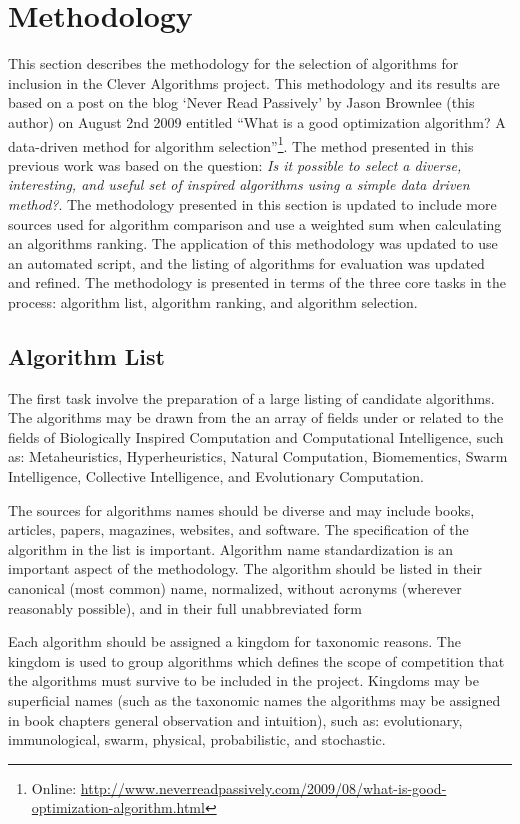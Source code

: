 \documentclass[a4paper, 11pt]{article}
\begin{document}
\section{Methodology}
\label{sec:methodology}
This section describes the methodology for the selection of algorithms for inclusion in the Clever Algorithms project. This methodology and its results are based on a post on the blog `Never Read Passively' by Jason Brownlee (this author) on August 2nd 2009 entitled ``What is a good optimization algorithm? A data-driven method for algorithm selection''\footnote{Online: \url{http://www.neverreadpassively.com/2009/08/what-is-good-optimization-algorithm.html}}. The method presented in this previous work was based on the question: \emph{Is it possible to select a diverse, interesting, and useful set of inspired algorithms using a simple data driven method?}. The methodology presented in this section is updated to include more sources used for algorithm comparison and use a weighted sum when calculating an algorithms ranking. The application of this methodology was updated to use an automated script, and the listing of algorithms for evaluation was updated and refined. The methodology is presented in terms of the three core tasks in the process: algorithm list, algorithm ranking, and algorithm selection.

% 
% 
\subsection{Algorithm List}
The first task involve the preparation of a large listing of candidate algorithms. The algorithms may be drawn from the an array of fields under or related to the fields of Biologically Inspired Computation and Computational Intelligence, such as: Metaheuristics, Hyperheuristics, Natural Computation, Biomementics, Swarm Intelligence, Collective Intelligence, and Evolutionary Computation.

The sources for algorithms names should be diverse and may include books, articles, papers, magazines, websites, and software. The specification of the algorithm in the list is important. Algorithm name standardization is an important aspect of the methodology. The algorithm should be listed in their canonical (most common) name, normalized, without acronyms (wherever reasonably possible), and in their full unabbreviated form

Each algorithm should be assigned a kingdom for taxonomic reasons. The kingdom is used to group algorithms which defines the scope of competition that the algorithms must survive to be included in the project. Kingdoms may be superficial names (such as the taxonomic names the algorithms may be assigned in book chapters general observation and intuition), such as: evolutionary, immunological, swarm, physical, probabilistic, and stochastic.
\end{document}
